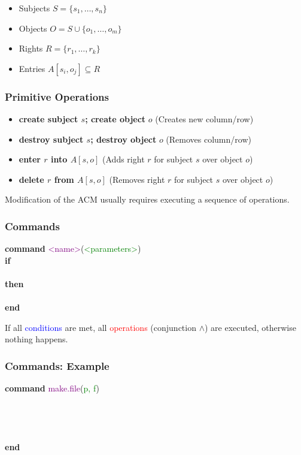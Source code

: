 \documentclass[12pt,A4]{extarticle}
\begin{document}
\begin{itemize}
  \item{Subjects $S = \{s_1, \dots, s_n\}$}
  \item{Objects $O = S \cup \{o_1, \dots, o_m\}$}
  \item{Rights $R = \{r_1, \dots, r_k\}$}
  \item{Entries $A[s_i, o_j] \subseteq R$}
\end{itemize}

\subsubsection{Primitive Operations}
\begin{itemize}
  \item{\textbf{create subject $s$; create object} $o$ (Creates new column/row)}
  \item{\textbf{destroy subject $s$; destroy object} $o$ (Removes column/row)}
  \item{\textbf{enter $r$ into $A[s,o]$} (Adds right $r$ for subject $s$ over object $o$)}
  \item{\textbf{delete $r$ from $A[s,o]$} (Removes right $r$ for subject $s$ over object $o$)}
\end{itemize}
Modification of the ACM usually requires executing a sequence of operations.

\subsubsection{Commands}
\textbf{command} \textcolor{purple}{\textless name\textgreater}(\textcolor{green}{\textless parameters\textgreater}) \\
\textbf{if}\\
\hspace*{10mm}{\textcolor{blue}{\textless conditions\textgreater}}\\
\textbf{then}\\
\hspace*{10mm}{\textcolor{red}{\textless operations\textgreater}}\\
\textbf{end}\par
If all \textcolor{blue}{conditions} are met, all \textcolor{red}{operations} (conjunction $\land$) are executed, otherwise nothing happens.

\subsubsection{Commands: Example}
\textbf{command} \textcolor{purple}{make.file}(\textcolor{green}{p, f}) \\
\textbf{
  \hspace*{10mm}{\textcolor{blue}{create object $f$;}}\\
  \hspace*{10mm}{\textcolor{blue}{center $own$ into $A[p, f]$;}}\\
  \hspace*{10mm}{\textcolor{blue}{enter $r$ into $A[p, f]$;}}\\
  \hspace*{10mm}{\textcolor{blue}{enter $w$ into $A[p, f]$;}}\\
  end}
\end{document}
